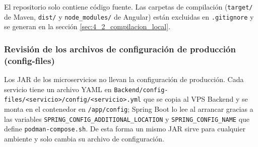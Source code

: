 El repositorio solo contiene código fuente. Las carpetas de compilación (\texttt{target/} de Maven, \texttt{dist/} y \texttt{node\_modules/} de Angular) están excluidas en \texttt{.gitignore} y se generan en la sección \ref{sec:4_2_compilacion_local}.

\subsubsection{Revisión de los archivos de configuración de producción (config-files)}\label{sec:4_1_2_config}
Los JAR de los microservicios no llevan la configuración de producción. Cada servicio tiene un archivo YAML en \texttt{Backend/config-files/<servicio>/config/<servicio>.yml} que se copia al VPS Backend y se monta en el contenedor en \texttt{/app/config}; Spring Boot lo lee al arrancar gracias a las variables \texttt{SPRING\_CONFIG\_ADDITIONAL\_LOCATION} y \texttt{SPRING\_CONFIG\_NAME} que define \texttt{podman-compose.sh}. De esta forma un mismo JAR sirve para cualquier ambiente y solo cambia su archivo de configuración.


